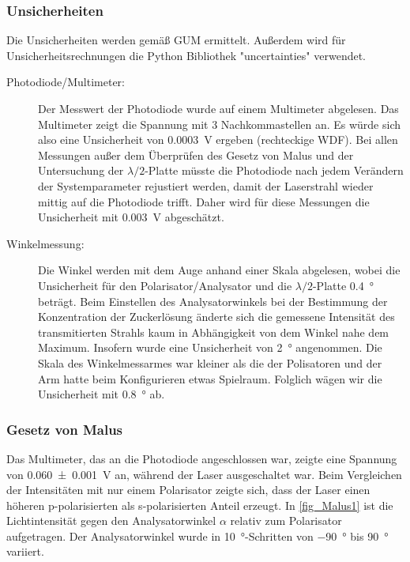 \documentclass[
	a4paper,
	12pt,
	pagesize,
	ngerman
]{scrartcl}
\begin{document}
	\subsubsection{Unsicherheiten} %
	Die Unsicherheiten werden gemäß GUM ermittelt. 
	Außerdem wird für Unsicherheitsrechnungen die Python Bibliothek "uncertainties" verwendet.
	\begin{description}
		\item[Photodiode/Multimeter:] Der Messwert der Photodiode wurde auf einem Multimeter abgelesen. 
			Das Multimeter zeigt die Spannung mit 3 Nachkommastellen an. 
			Es würde sich also eine Unsicherheit von \SI{0,0003}{V} ergeben (rechteckige WDF). 
			Bei allen Messungen außer dem Überprüfen des Gesetz von Malus und der Untersuchung der $\lambda/2$-Platte müsste die Photodiode nach jedem Verändern der Systemparameter rejustiert werden, damit der Laserstrahl wieder mittig auf die Photodiode trifft. 
			Daher wird für diese Messungen die Unsicherheit mit \SI{0,003}{V} abgeschätzt. %
		\item[Winkelmessung:]  Die Winkel werden mit dem Auge anhand einer Skala abgelesen, wobei die Unsicherheit für den Polarisator/Analysator und die $\lambda/2$-Platte \SI{0,4}{\degree} beträgt. 
			Beim Einstellen des Analysatorwinkels bei der Bestimmung der Konzentration der Zuckerlösung änderte sich die gemessene Intensität des transmitierten Strahls kaum in Abhängigkeit von dem Winkel nahe dem Maximum. 
			Insofern wurde eine Unsicherheit von \SI{2}{\degree} angenommen.
			Die Skala des Winkelmessarmes war kleiner als die der Polisatoren und der Arm hatte beim Konfigurieren etwas Spielraum. 
			Folglich wägen wir die Unsicherheit mit \SI{0,8}{\degree} ab.
	\end{description} 

	\subsubsection{Gesetz von Malus}
	Das Multimeter, das an die Photodiode angeschlossen war, zeigte eine Spannung von \SI{0,060+-0,001}{V} an, während der Laser ausgeschaltet war.
	Beim Vergleichen der Intensitäten mit nur einem Polarisator zeigte sich, dass der Laser einen höheren p-polarisierten als s-polarisierten Anteil erzeugt.
	In \cref{fig_Malus1} ist die Lichtintensität gegen den Analysatorwinkel $\alpha$ relativ zum Polarisator aufgetragen.
	Der Analysatorwinkel wurde in \SI{10}{\degree}-Schritten von \SI{-90}{\degree} bis \SI{90}{\degree} variiert.
\end{document}
